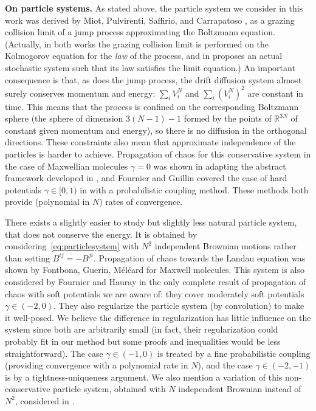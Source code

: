 \documentclass[11pt,a4paper]{article}
\theoremstyle{definition}
\theoremstyle{plain}
\begin{document}
\textbf{On particle systems.} 
As stated above, the particle system we consider in this work was derived by Miot, Pulvirenti, Saffirio, and Carrapatoso \cite{MiotPulvirentiSaffirio2011, Carrapatoso2015}, as a grazing collision limit of a jump process approximating the Boltzmann equation. (Actually, in both works the grazing collision limit is performed on the Kolmogorov equation for the \textit{law} of the process, and in \cite{Carrapatoso2015} proposes an actual stochastic system such that its law satisfies the limit equation.) An important consequence is that, as does the jump process, the drift diffusion system almost surely conserves momentum and energy: $\sum_i V^N_i$ and $\sum_i (V^N_i)^2$ are constant in time. This means that the process is confined on the corresponding Boltzmann sphere (the sphere of dimension $3(N-1)-1$ formed by the points of $\mathbb{R}^{3N}$ of constant given momentum and energy), so there is no diffusion in the orthogonal directions. These constraints also mean that approximate independence of the particles is harder to achieve. Propagation of chaos for this conservative system in the case of Maxwellian molecules $\gamma=0$ was shown in \cite{Carrapatoso2015} adapting the abstract framework developed in \cite{MischlerMouhot2012}, and Fournier and Guillin covered the case of hard potentials $\gamma\in[0,1)$ in \cite{NicolasFournierArnaudGuillin2017} with a probabilistic coupling method. These methods both provide (polynomial in $N$) rates of convergence.

There exists a slightly easier to study but slightly less natural particle system, that does not conserve the energy. It is obtained by considering~\eqref{eq:particlesystem} with $N^2$ independent Brownian motions rather than setting $B^{ij}=-B^{ji}$. Propagation of chaos towards the Landau equation was shown by Fontbona, Guerin, Méléard \cite{FontbonaGuerinMeleard2007} for Maxwell molecules. This system is also considered by Fournier and Hauray \cite{FournierHauray2015} in the only complete result of propagation of chaos with soft potentials we are aware of: they cover moderately soft potentials $\gamma\in(-2,0)$.
They also regularize the particle system (by convolution) to make it well-posed. We believe the difference in regularization has little influence on the system since both are arbitrarily small (in fact, their regularization could probably fit in our method but some proofs and inequalities would be less straightforward). The case $\gamma\in(-1,0)$ is treated by a fine probabilistic coupling (providing convergence with a polynomial rate in $N$), and the case $\gamma\in(-2,-1)$ is by a tightness-uniqueness argument. We also mention a variation of this non-conservative particle system, obtained with $N$ independent Brownian instead of $N^2$, considered in \cite{CarrilloFengGuo2024, CarrilloGuoJabin2024}.
\end{document}
